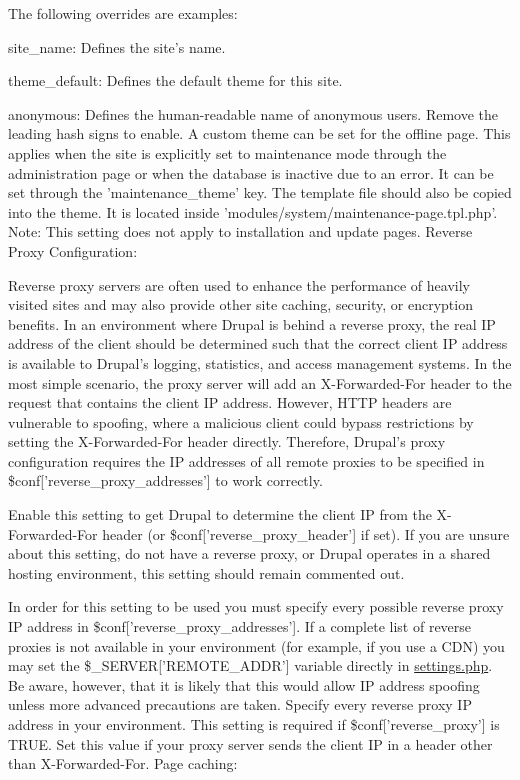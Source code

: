 The following overrides are examples:
\begin{DoxyItemize}
\item site\_\-name: Defines the site's name.
\item theme\_\-default: Defines the default theme for this site.
\item anonymous: Defines the human-\/readable name of anonymous users. Remove the leading hash signs to enable. A custom theme can be set for the offline page. This applies when the site is explicitly set to maintenance mode through the administration page or when the database is inactive due to an error. It can be set through the 'maintenance\_\-theme' key. The template file should also be copied into the theme. It is located inside 'modules/system/maintenance-\/page.tpl.php'. Note: This setting does not apply to installation and update pages. Reverse Proxy Configuration:
\end{DoxyItemize}

Reverse proxy servers are often used to enhance the performance of heavily visited sites and may also provide other site caching, security, or encryption benefits. In an environment where Drupal is behind a reverse proxy, the real IP address of the client should be determined such that the correct client IP address is available to Drupal's logging, statistics, and access management systems. In the most simple scenario, the proxy server will add an X-\/Forwarded-\/For header to the request that contains the client IP address. However, HTTP headers are vulnerable to spoofing, where a malicious client could bypass restrictions by setting the X-\/Forwarded-\/For header directly. Therefore, Drupal's proxy configuration requires the IP addresses of all remote proxies to be specified in \$conf\mbox{[}'reverse\_\-proxy\_\-addresses'\mbox{]} to work correctly.

Enable this setting to get Drupal to determine the client IP from the X-\/Forwarded-\/For header (or \$conf\mbox{[}'reverse\_\-proxy\_\-header'\mbox{]} if set). If you are unsure about this setting, do not have a reverse proxy, or Drupal operates in a shared hosting environment, this setting should remain commented out.

In order for this setting to be used you must specify every possible reverse proxy IP address in \$conf\mbox{[}'reverse\_\-proxy\_\-addresses'\mbox{]}. If a complete list of reverse proxies is not available in your environment (for example, if you use a CDN) you may set the \$\_\-SERVER\mbox{[}'REMOTE\_\-ADDR'\mbox{]} variable directly in \hyperlink{settings_8php}{settings.php}. Be aware, however, that it is likely that this would allow IP address spoofing unless more advanced precautions are taken. Specify every reverse proxy IP address in your environment. This setting is required if \$conf\mbox{[}'reverse\_\-proxy'\mbox{]} is TRUE. Set this value if your proxy server sends the client IP in a header other than X-\/Forwarded-\/For. Page caching:

